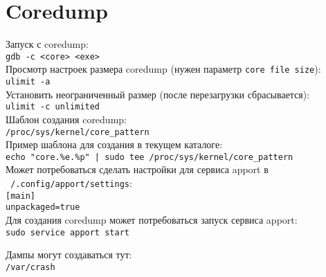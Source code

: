 \section{Coredump}

\noindent Запуск с coredump: \\
\indent \texttt{gdb -c <core> <exe>} \\

\noindent Просмотр настроек размера coredump (нужен параметр \texttt{core file size}): \\
\indent \texttt{ulimit -a }\\
\noindent Установить неограниченный размер (после перезагрузки сбрасывается): \\
\indent \texttt{ulimit -c unlimited} \\

\noindent Шаблон создания coredump: \\
\indent \texttt{/proc/sys/kernel/core\_pattern} \\
\noindent Пример шаблона для создания в текущем каталоге: \\
\indent \texttt{echo "core.\%e.\%p" | sudo tee /proc/sys/kernel/core\_pattern} \\


\noindent Может потребоваться сделать настройки для сервиса apport в\\ \texttt{~/.config/apport/settings}: \\
\indent \texttt{[main]} \\
\indent \texttt{unpackaged=true} \\

\noindent Для создания coredump может потребоваться запуск сервиса apport: \\
\indent \texttt{sudo service apport start}

\noindent Дампы могут создаваться тут: \\
\indent \texttt{/var/crash}
